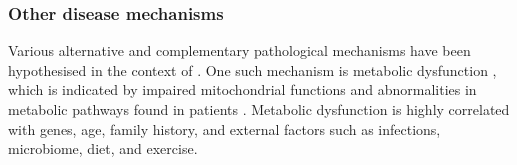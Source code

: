 


\subsubsection{Other disease mechanisms}

Various alternative and complementary pathological mechanisms have been hypothesised in the context of \cfs.
One such mechanism is metabolic dysfunction \citep{maya2023SurveyingMetabolic}, which is indicated by impaired mitochondrial functions \citep{nilsson2020MetabolicDysfunction} and abnormalities in metabolic pathways found in patients \citep{naviaux2016MetabolicFeatures}.
Metabolic dysfunction is highly correlated with genes, age, family history, and external factors such as infections, microbiome, diet, and exercise.

